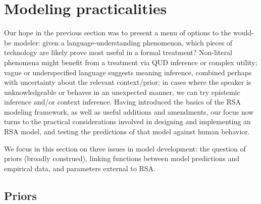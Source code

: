 \documentclass{sp}
\newcommand{\gcs}[1]{\textcolor{blue}{[gcs: #1]}}
\newcommand{\mht}[1]{\textcolor{purple}{[mht: #1]}}
\begin{document}
%


\section{Modeling practicalities} \label{practicalities}

Our hope in the previous section was to present a menu of options to the would-be modeler: given a language-understanding phenomenon, which pieces of technology are likely prove most useful in a formal treatment? Non-literal phenomena might benefit from a treatment via QUD inference or complex utility; vague or underspecified language suggests meaning inference, combined perhaps with uncertainty about the relevant context/prior; in cases where the speaker is unknowledgeable or behaves in an unexpected manner, we can try epistemic inference and/or context inference. Having introduced the basics of the RSA modeling framework, as well as useful additions and amendments, our focus now turns to the practical considerations involved in designing and implementing an RSA model, and testing the predictions of that model against human behavior. 

We focus in this section on three issues in model development: the question of priors (broadly construed), linking functions between model predictions and empirical data, and parameters external to RSA. 

\subsection{Priors}
 
\end{document}
